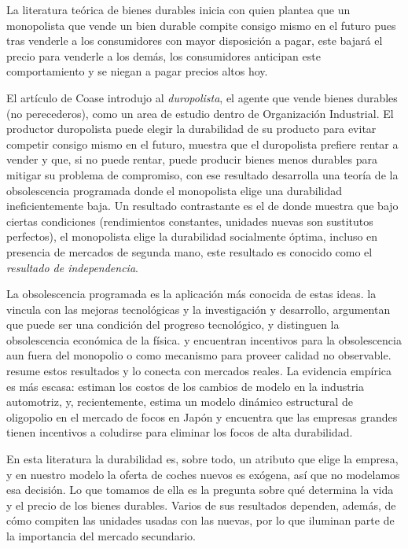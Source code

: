 \documentclass{article}
\begin{document}
La literatura teórica de bienes durables inicia con \textcite{Coase1972} quien plantea que un monopolista que vende un bien durable compite consigo mismo en el futuro pues tras venderle a los consumidores con mayor disposición a pagar, este bajará el precio para venderle a los demás, los consumidores anticipan este comportamiento y se niegan a pagar precios altos hoy.

El artículo de Coase introdujo al \textit{duropolista}, el agente que vende bienes durables (no perecederos), como un area de estudio dentro de Organización Industrial. El productor duropolista puede elegir la durabilidad de su producto para evitar competir consigo mismo en el futuro, \textcite{Bulow1982} muestra que el duropolista prefiere rentar a vender y que, si no puede rentar, puede producir bienes menos durables para mitigar su problema de compromiso, con ese resultado \textcite{Bulow1986} desarrolla una teoría de la obsolescencia programada donde el monopolista elige una durabilidad ineficientemente baja. Un resultado contrastante es el de \textcite{Swan1970,Swan1972} donde muestra que bajo ciertas condiciones (rendimientos constantes, unidades nuevas son sustitutos perfectos), el monopolista elige la durabilidad socialmente óptima, incluso en presencia de mercados de segunda mano, este resultado es conocido como el \textit{resultado de independencia}.

La obsolescencia programada es la aplicación más conocida de estas ideas. \textcite{Waldman1993,Waldman1996} la vincula con las mejoras tecnológicas y la investigación y desarrollo, \textcite{Fishman1993} argumentan que puede ser una condición del progreso tecnológico, y \textcite{LeeLee1998} distinguen la obsolescencia económica de la física. \textcite{GroutPark2005} y \textcite{Strausz2009} encuentran incentivos para la obsolescencia aun fuera del monopolio o como mecanismo para proveer calidad no observable. \textcite{Waldman2003} resume estos resultados y lo conecta con mercados reales. La evidencia empírica es más escasa: \textcite{FisherGrilichesKaysen1962} estiman los costos de los cambios de modelo en la industria automotriz, y, recientemente, \textcite{Fukasawa2025} estima un modelo dinámico estructural de oligopolio en el mercado de focos en Japón y encuentra que las empresas grandes tienen incentivos a coludirse para eliminar los focos de alta durabilidad.

En esta literatura la durabilidad es, sobre todo, un atributo que elige la empresa, y en nuestro modelo la oferta de coches nuevos es exógena, así que no modelamos esa decisión. Lo que tomamos de ella es la pregunta sobre qué determina la vida y el precio de los bienes durables. Varios de sus resultados dependen, además, de cómo compiten las unidades usadas con las nuevas, por lo que iluminan parte de la importancia del mercado secundario.
\end{document}
